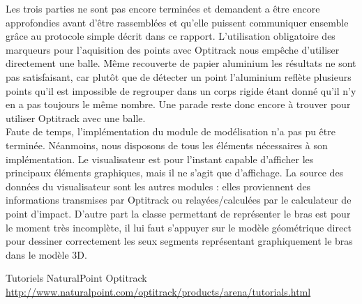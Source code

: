 \documentclass{article}[11pt]
\begin{document}
Les trois parties ne sont pas encore terminées et demandent a être encore approfondies avant d'être rassemblées et qu'elle puissent communiquer ensemble grâce au protocole simple décrit dans ce rapport. L'utilisation obligatoire des marqueurs pour l'aquisition des points avec Optitrack nous empêche d'utiliser directement une balle. Même recouverte de papier aluminium les résultats ne sont pas satisfaisant, car plutôt que de détecter un point l'aluminium reflète plusieurs points qu'il est impossible de regrouper dans un corps rigide étant donné qu'il n'y en a pas toujours le même nombre. Une parade reste donc encore à trouver pour utiliser Optitrack avec une balle. \\

Faute de temps, l'implémentation du module de modélisation n'a pas pu être terminée. Néanmoins, nous disposons de tous les éléments nécessaires à son implémentation. Le visualisateur est pour l'instant capable d'afficher les principaux éléments graphiques, mais il ne s'agit que d'affichage. La source des données du visualisateur sont les autres modules : elles proviennent des informations transmises par Optitrack ou relayées/calculées par le calculateur de point d'impact. D'autre part la classe permettant de représenter le bras est pour le moment très incomplète, il lui faut s'appuyer sur le modèle géométrique direct pour dessiner correctement les seux segments représentant graphiquement le bras dans le modèle 3D.


\begin{thebibliography}{}
  Tutoriels NaturalPoint Optitrack \\
  \url{http://www.naturalpoint.com/optitrack/products/arena/tutorials.html}

\end{thebibliography} 
\end{document}
